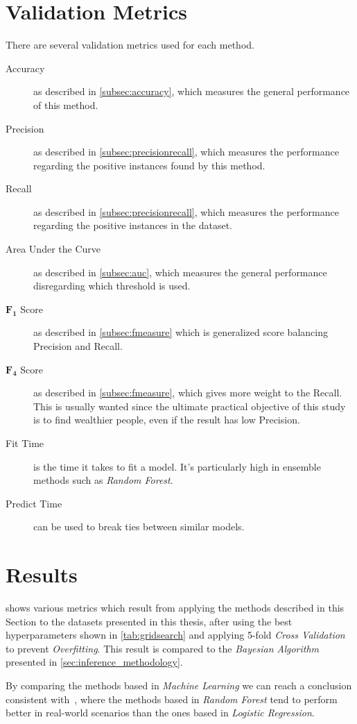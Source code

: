 \section{Validation Metrics}
\label{subsec:validationmetrics}
There are several validation metrics used for each method.

\begin{description}
	\item[Accuracy] as described in \cref{subsec:accuracy}, which measures the general performance of this method.
	\item[Precision] as described in \cref{subsec:precisionrecall}, which measures the performance regarding the positive instances found by this method.
	\item[Recall] as described in \cref{subsec:precisionrecall}, which measures the performance regarding the positive instances in the dataset.
	\item[Area Under the Curve] as described in \cref{subsec:auc}, which measures the general performance disregarding which threshold is used.
	\item[$\mathbf{F_1}$ Score] as described in \cref{subsec:fmeasure} which is generalized score balancing Precision and Recall.
	\item[$\mathbf{F_4}$ Score] as described in \cref{subsec:fmeasure}, which gives more weight to the Recall. This is usually wanted since the ultimate practical objective of this study is to find wealthier people, even if the result has low Precision.
	\item[Fit Time] is the time it takes to fit a model. It's particularly high in ensemble methods such as \emph{Random Forest}.
	\item[Predict Time] can be used to break ties between similar models.
\end{description}

\section{Results}

 shows various metrics which result from applying the methods described in this Section to the datasets presented in this thesis, after using the best hyperparameters shown in \cref{tab:gridsearch} and applying 5-fold \emph{Cross Validation} to prevent \emph{Overfitting}. This result is compared to the \emph{Bayesian Algorithm} presented in \cref{sec:inference_methodology}.

By comparing the methods based in \emph{Machine Learning} we can reach a conclusion consistent with~\cite{muchlinski2016}, where the methods based in \emph{Random Forest} tend to perform better in real-world scenarios than the ones based in \emph{Logistic Regression}.

